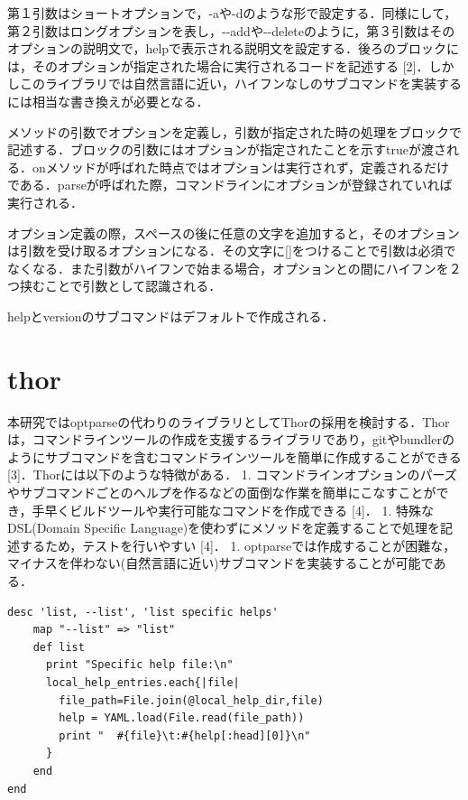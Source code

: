 第１引数はショートオプションで，-aや-dのような形で設定する．同様にして，第２引数はロングオプションを表し，-\/-addや-\/-deleteのように，第３引数はそのオプションの説明文で，helpで表示される説明文を設定する．後ろのブロックには，そのオプションが指定された場合に実行されるコードを記述する
{[}2{]}．しかしこのライブラリでは自然言語に近い，ハイフンなしのサブコマンドを実装するには相当な書き換えが必要となる．

メソッドの引数でオプションを定義し，引数が指定された時の処理をブロックで記述する．ブロックの引数にはオプションが指定されたことを示すtrueが渡される．onメソッドが呼ばれた時点ではオプションは実行されず，定義されるだけである．parseが呼ばれた際，コマンドラインにオプションが登録されていれば実行される．

オプション定義の際，スペースの後に任意の文字を追加すると，そのオプションは引数を受け取るオプションになる．その文字に{[}{]}をつけることで引数は必須でなくなる．また引数がハイフンで始まる場合，オプションとの間にハイフンを２つ挟むことで引数として認識される．

helpとversionのサブコマンドはデフォルトで作成される．

\section{thor}\label{thor}

本研究ではoptparseの代わりのライブラリとしてThorの採用を検討する．Thorは，コマンドラインツールの作成を支援するライブラリであり，gitやbundlerのようにサブコマンドを含むコマンドラインツールを簡単に作成することができる
{[}3{]}．Thorには以下のような特徴がある． 1.
コマンドラインオプションのパーズやサブコマンドごとのヘルプを作るなどの面倒な作業を簡単にこなすことができ，手早くビルドツールや実行可能なコマンドを作成できる
{[}4{]}． 1. 特殊なDSL(Domain Specific
Language)を使わずにメソッドを定義することで処理を記述するため，テストを行いやすい
{[}4{]}． 1.
optparseでは作成することが困難な，マイナスを伴わない(自然言語に近い)サブコマンドを実装することが可能である．

\begin{screen}
{\small
\begin{verbatim}
desc 'list, --list', 'list specific helps'
    map "--list" => "list"
    def list
      print "Specific help file:\n"
      local_help_entries.each{|file|
        file_path=File.join(@local_help_dir,file)
        help = YAML.load(File.read(file_path))
        print "  #{file}\t:#{help[:head][0]}\n"
      }
    end
end
\end{verbatim}}
\end{screen}


